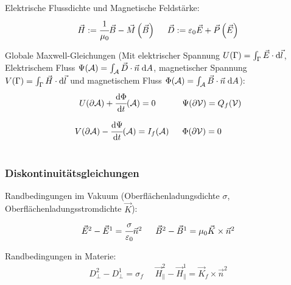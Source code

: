 \documentclass[11pt]{article}
\numberwithin{equation}{section}
\begin{document}
			\noindent
			Elektrische Flussdichte und Magnetische Feldstärke:
			\begin{equation} \label{eq:flussdichte-feldstärke}
			\begin{array}{cc}
				\vec{H} := \cfrac{1}{\mu_0}\Vec{B} - \vec{M}\left(\vec{B}\right)
				&\;\; \vec{D} := \varepsilon_0\vec{E} + \vec{P}\left(\vec{E}\right)
			\end{array}
			\end{equation}


			\noindent
			Globale Maxwell-Gleichungen (Mit elektrischer Spannung $U(\Gamma)=\int_\Gamma \vec{E}\cdot\mathrm{d}\vec{l}$, Elektrischem Fluss $\Psi(\mathcal{A})=\int_\mathcal{A}\vec{D}\cdot\vec{n}\;\mathrm{d} A$, magnetischer Spannung $V(\Gamma)=\int_\Gamma \vec{H}\cdot\mathrm{d}\vec{l}$ und magnetischem Fluss $\Phi(\mathcal{A})=\int_\mathcal{A}\vec{B}\cdot\vec{n}\;\mathrm{d} A$):
			\begin{equation}
			\begin{array}{rl}
				U(\partial \mathcal{A}) + \cfrac{\diff\Phi}{\diff t}(\mathcal{A}) = 0\phantom{(\mathcal{A})}
				&\;\; \Psi(\partial\mathcal{V}) = Q_f(\mathcal{V}) \\ \xrowht{40pt}
				V(\partial \mathcal{A}) - \cfrac{\diff \Psi}{\diff t}(\mathcal{A}) = I_f(\mathcal{A})
				&\;\; \Phi(\partial\mathcal{V}) = 0 \\
			\end{array}
			\end{equation}

			\subsubsection{Diskontinuitätsgleichungen}
				\noindent
				Randbedingungen im Vakuum (Oberflächenladungsdichte $\sigma$, Oberflächenladungsstromdichte $\vec{K}$):
			\begin{equation}
			\begin{array}{cc}
				\vec{E}^2 - \vec{E}^1 = \cfrac{\sigma}{\varepsilon_0}\Vec{n}^2
				&\;\; \vec{B}^2 - \vec{B}^1 = \mu_0\vec{K}\times\Vec{n}^2
			\end{array}
			\end{equation}

				\noindent
				Randbedingungen in Materie:
			\begin{equation}
			\begin{array}{cc}
				D_\perp^2 - D_\perp^1 = \sigma_f
				&\;\; \vec{H}_\parallel^2 - \vec{H}_\parallel^1 = \vec{K}_f\times\Vec{n}^2
			\end{array}
			\end{equation}
\end{document}
